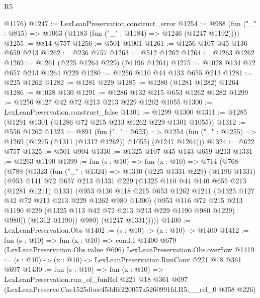 \begin{lexlean}{R5}
\begin{coremodule}
      @1176)
@1247 := LexLeanPreservation.construct_error
@1254 := @988 (fun ("_" : @815) => @1063 (@1183 (fun ("_" : @1184) => @1246 (@1247 @1192))))
@1255 := @814 @757
@1256 := @501 @1001
@1261 := @1256 @107 @45 @136 @659 @213
@1262 := @236 @757
@1263 := @512 @1262
@1264 := @1263 @1262
@1269 := @1261 (@225 @1264 @229) (@1196 @1264)
@1275 := @1028 @134 @72 @657 @213 @1264 @229
@1280 := @1256 @110 @44 @133 @655 @213
@1281 := @225 @1262
@1282 := @1281 @229
@1285 := @1280 (@1281 @1282) @1264
@1286 := @1028 @130
@1291 := @1286 @132 @215 @653 @1262 @1282
@1299 := @1256 @127 @42 @72 @213 @213 @229 @1262 @1055
@1300 := LexLeanPreservation.construct_false
@1301 := @1299 @1300
@1311 := @1285 (@1291 @1301 (@1286 @72 @215 @213 @1262 @229 @1301 @1055))
@1312 := @556 @1262
@1323 := @891
    (fun ("_" : @623) =>
    @1254 (fun ("_" : @1255) => @1269 (@1275 (@1311 (@1312 @1262)) @1055) (@1247 @1264)))
@1324 := @622 @757
@1325 := @501 @904
@1330 := @1325 @107 @45 @143 @659 @213
@1331 := @1263 @1190
@1399 := fun (s : @10) =>
  fun (x : @10) =>
  @714
    (@768
      (@789
        (@1323
          (fun ("_" : @1324) =>
          @1330
            (@225 @1331 @229)
            (@1196 @1331)
            (@953
              @141
              @72
              @657
              @213
              @1331
              @229
              (@1325
                @110
                @44
                @140
                @655
                @213
                (@1281 @1211)
                @1331
                (@953
                  @130
                  @118
                  @215
                  @653
                  @1262
                  @1211
                  (@1325 @127 @42 @72 @213 @213 @229 @1262 @980 @1300)
                  (@953
                    @116
                    @72
                    @215
                    @213
                    @1190
                    @229
                    (@1325 @113 @42 @72 @213 @213 @229 @1190 @980 @1229)
                    @980))
                (@1312 @1190))
              @980)
            (@1247 @1331)))))
@1400 := LexLeanPreservation.Obs
@1402 := (s : @10) -> (x : @10) -> @1400
@1412 := fun (s : @10) =>
  fun (x : @10) =>
  cond.{1} @1400 @679 (LexLeanPreservation.Obs.value @696) LexLeanPreservation.Obs.overflow
@1419 := (s : @10) -> (x : @10) -> LexLeanPreservation.RunConv @221 @18 @361 @697
@1430 := fun (s : @10) =>
  fun (x : @10) =>
  LexLeanPreservation.run_of_funRel
    @221
    @18
    @361
    @697
    (LexLeanPreserve.Cae1525dbec453d6f220057a5260991fd.R5.__rel_0 @358 @226)
\end{coremodule}
\end{lexlean}
